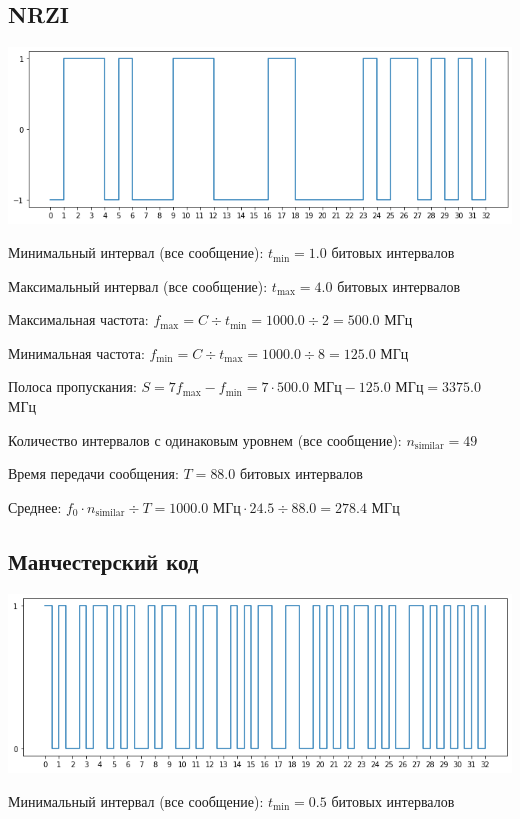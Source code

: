 \subsection{NRZI}
\includegraphics[width=\textwidth]{3nrzi}

Минимальный интервал (все сообщение): $t_\mathrm{min}=1.0$ битовых интервалов

Максимальный интервал (все сообщение): $t_\mathrm{max}=4.0$ битовых интервалов

Максимальная частота: $f_\mathrm{max}=C\div t_\mathrm{min}=1000.0\div 2=500.0$ МГц

Минимальная частота: $f_\mathrm{min}=C\div t_\mathrm{max}=1000.0\div 8=125.0$ МГц

Полоса пропускания: $S=7f_\mathrm{max}-f_\mathrm{min} = 7\cdot 500.0\text{ МГц}-125.0\text{ МГц}=3375.0$ МГц

Количество интервалов с одинаковым уровнем (все сообщение): $n_\mathrm{similar}=49$

Время передачи сообщения: $T=88.0$ битовых интервалов

Среднее: $f_0\cdot n_\mathrm{similar}\div T=1000.0\text{ МГц}\cdot 24.5\div 88.0=278.4$ МГц

\subsection{Манчестерский код}
\includegraphics[width=\textwidth]{3manchester}

Минимальный интервал (все сообщение): $t_\mathrm{min}=0.5$ битовых интервалов

